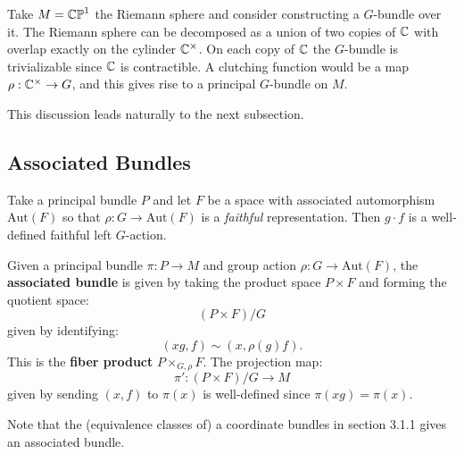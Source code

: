 		\begin{eg}
			Take $M = \mathbb{CP}^1$ the Riemann sphere and consider constructing a $G$-bundle over it. The Riemann sphere can be decomposed as a union of two copies of $\mathbb{C}$ with overlap exactly on the cylinder $\mathbb{C}^{\times}$. On each copy of $\mathbb{C}$ the $G$-bundle is trivializable since $\mathbb{C}$ is contractible. A clutching function would be a map $\rho: \mathbb{C}^\times \to G$, and this gives rise to a principal $G$-bundle on $M$. 
		\end{eg}
		
		This discussion leads naturally to the next subsection. 
		
		
		\subsection{Associated Bundles}
		Take a principal bundle $P$ and let $F$ be a space with associated automorphism $\mathrm{Aut}(F)$ so that $\rho: G \to \mathrm{Aut}(F)$ is a \emph{faithful} representation. Then $g \cdot f$ is a well-defined faithful left $G$-action.
		\begin{defn}
			Given a principal bundle $\pi: P \to M$ and group action $\rho: G \to \mathrm{Aut}(F)$, the \textbf{associated bundle} is given by taking the product space $P \times F$ and forming the quotient space:
			\[
				(P \times F) / G
			\]
			given by identifying:
			\[
				(x g, f) \sim (x, \rho(g) f).
			\]
			This is the \textbf{fiber product} $P \times_{G, \rho} F$. The projection map:
			\[
				\pi': (P \times F) / G \to M
			\]
			given by sending $(x, f)$ to $\pi(x)$ is well-defined since $\pi(x g) = \pi(x)$.
		\end{defn}
		Note that the (equivalence classes of) a coordinate bundles in section 3.1.1 gives an associated bundle.
		
